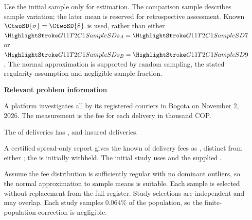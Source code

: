 Use the initial sample only for estimation. The comparison sample describes sample variation; the later mean is reserved for retrospective assessment. Known $\CtwoSD{\sigma}=\CtwoSD{8}$ is used, rather than either $\SSD{s_A}=\SSD{7}$ or $\SSD{s_B}=\SSD{9}$. The normal approximation is supported by random sampling, the stated regularity assumption and negligible sample fraction.

\secInicio[][sec:p3]

\clearpage



\textbf{Relevant problem information}

\begin{probleminfoexcerpt}
A platform investigates all    by its registered couriers in Bogota on November 2, 2026. The measurement is the fee for each delivery in thousand COP.
\end{probleminfoexcerpt}

\begin{probleminfoexcerpt}
The     of  deliveries has     ,       and  insured deliveries.
\end{probleminfoexcerpt}

\begin{probleminfoexcerpt}
A certified spread-only report gives the known    of delivery fees as   , distinct from either   ; the   is initially withheld. The initial study uses   and the supplied      .
\end{probleminfoexcerpt}

\begin{probleminfoexcerpt}
Assume the fee distribution is sufficiently regular with no dominant outliers, so the normal approximation to sample means is suitable. Each sample is selected without replacement from the full register. Study selections are independent and may overlap. Each study samples 0.064\% of the population, so the finite-population correction is negligible.
\end{probleminfoexcerpt}

